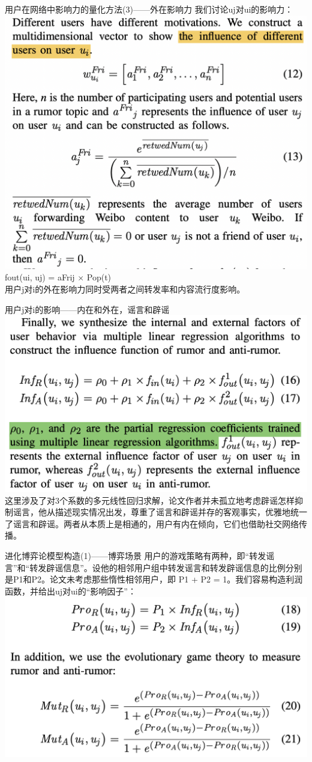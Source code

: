 \documentclass{beamer}
\begin{document}
\begin{frame}{用户在网络中影响力的量化方法(3)——外在影响力}
	我们讨论uj对ui的影响力：
	\includegraphics[width=0.6\linewidth]{Assets/外在影响.png}\\
	fout(ui, uj) = aFrij × Pop(t)\\
	用户j对i的外在影响力同时受两者之间转发率和内容流行度影响。
\end{frame}

\begin{frame}{用户j对i的影响——内在和外在，谣言和辟谣}
	\includegraphics[width=0.8\linewidth]{Assets/Inf_RA.png}\\
	这里涉及了对3个系数的多元线性回归求解，论文作者并未孤立地考虑辟谣怎样抑制谣言，他从描述现实情况出发，尊重了谣言和辟谣并存的客观事实，优雅地统一了谣言和辟谣。两者从本质上是相通的，用户有内在倾向，它们也借助社交网络传播。
\end{frame}

\begin{frame}{进化博弈论模型构造(1)——博弈场景}
	用户的游戏策略有两种，即“转发谣言”和“转发辟谣信息”。设他的相邻用户组中转发谣言和转发辟谣信息的比例分别是P1和P2。论文未考虑那些惰性相邻用户，即 P1 + P2 = 1。我们容易构造利润函数，并给出uj对ui的“影响因子”：
	\includegraphics[width=0.8\linewidth]{Assets/进化博弈论-1.png}
\end{frame}
\end{document}
